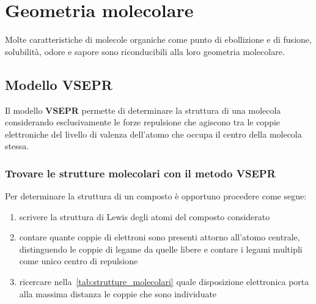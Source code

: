 \section{Geometria molecolare}
Molte caratteristiche di molecole organiche come punto di ebollizione e di fusione, solubilità, odore e sapore sono riconducibili alla loro geometria molecolare.

\subsection{Modello VSEPR}
Il modello \textbf{\Ac{VSEPR}} permette di determinare la struttura di una molecola considerando esclusivamente le forze repulsione che agiscono tra le coppie elettroniche del livello di valenza dell'atomo che occupa il centro della molecola stessa.

\subsubsection{Trovare le strutture molecolari con il metodo VSEPR}
\noindent Per determinare la struttura di un composto è opportuno procedere come segue:
\begin{enumerate}
	\item scrivere la struttura di Lewis degli atomi del composto considerato
	\item contare quante coppie di elettroni sono presenti attorno all'atomo centrale, distinguendo le coppie di legame da quelle libere e contare i legami multipli come unico centro di repulsione
	\item ricercare nella~\autoref{tab:strutture_molecolari} quale disposizione elettronica porta alla massima distanza le coppie che sono individuate
\end{enumerate}

